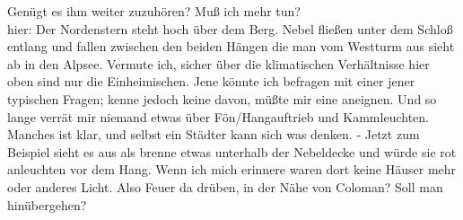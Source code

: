 \documentclass[
]{article}
\begin{document}
\begin{enumerate}
  Genügt es ihm weiter zuzuhören? Muß ich mehr tun?\\
  hier: Der Nordenstern steht hoch über dem Berg. Nebel fließen unter
  dem Schloß entlang und fallen zwischen den beiden Hängen die man vom
  Westturm aus sieht ab in den Alpsee. Vermute ich, sicher über die
  klimatischen Verhältnisse hier oben sind nur die Einheimischen. Jene
  könnte ich befragen mit einer jener typischen Fragen; kenne jedoch
  keine davon, müßte mir eine aneignen. Und so lange verrät mir niemand
  etwas über Fön/Hangauftrieb und Kammleuchten. Manches ist klar, und
  selbst ein Städter kann sich was denken. - Jetzt zum Beispiel sieht es
  aus als brenne etwas unterhalb der Nebeldecke und würde sie rot
  anleuchten vor dem Hang. Wenn ich mich erinnere waren dort keine
  Häuser mehr oder anderes Licht. Also Feuer da drüben, in der Nähe von
  Coloman? Soll man hinübergehen?
\end{enumerate}
\end{document}
